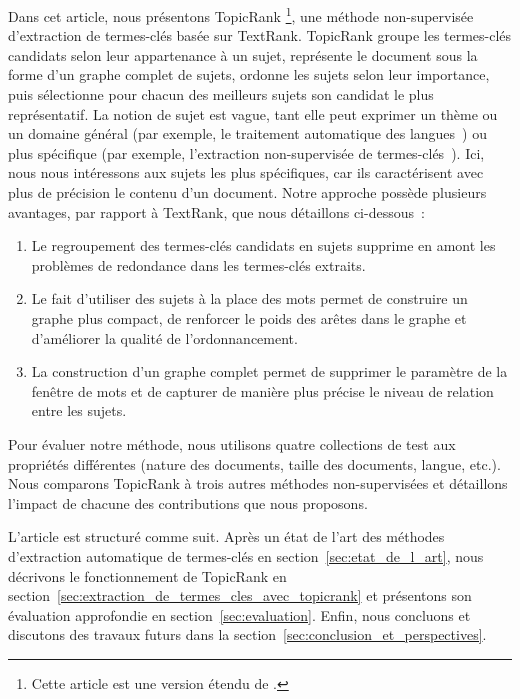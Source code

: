   Dans cet article, nous présentons TopicRank \footnote{Cette article est une
  version étendu de \cite{bougouin2013topicrank}.}, une méthode non-supervisée
  d'extraction de termes-clés basée sur TextRank. TopicRank groupe les
  termes-clés candidats selon leur appartenance à un sujet, représente le
  document sous la forme d'un graphe complet de sujets, ordonne les sujets selon
  leur importance, puis sélectionne pour chacun des meilleurs sujets son
  candidat le plus représentatif. La notion de sujet est vague, tant elle peut
  exprimer un thème ou un domaine général (par exemple, \og le traitement
  automatique des langues~\fg) ou plus spécifique (par exemple, \og l'extraction
  non-supervisée de termes-clés~\fg). Ici, nous nous intéressons aux sujets les
  plus spécifiques, car ils caractérisent avec plus de précision le contenu d'un
  document. Notre approche possède plusieurs avantages, par rapport à TextRank,
  que nous détaillons ci-dessous~:
  \begin{enumerate}
    \item{Le regroupement des termes-clés candidats en sujets supprime en amont
          les problèmes de redondance dans les termes-clés extraits.}
    \item{Le fait d'utiliser des sujets à la place des mots permet de construire
          un graphe plus compact, de renforcer le poids des arêtes dans le
          graphe et d'améliorer la qualité de l'ordonnancement.}
    \item{La construction d'un graphe complet permet de supprimer le paramètre
          de la fenêtre de mots et de capturer de manière plus précise le niveau
          de relation entre les sujets.}
  \end{enumerate}

  Pour évaluer notre méthode, nous utilisons quatre collections de test aux
  propriétés différentes (nature des documents, taille des documents, langue,
  etc.). Nous comparons TopicRank à trois autres méthodes non-supervisées et
  détaillons l'impact de chacune des contributions que nous proposons.

  L'article est structuré comme suit. Après un état de l'art des méthodes
  d'extraction automatique de termes-clés en section~\ref{sec:etat_de_l_art},
  nous décrivons le fonctionnement de TopicRank en
  section~\ref{sec:extraction_de_termes_cles_avec_topicrank} et présentons son
  évaluation approfondie en section~\ref{sec:evaluation}. Enfin, nous concluons
  et discutons des travaux futurs dans la
  section~\ref{sec:conclusion_et_perspectives}.
